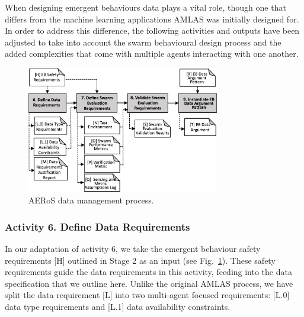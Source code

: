 \documentclass[runningheads]{llncs}
\begin{document}
When designing emergent behaviours data plays a vital role, though one that differs from the machine learning applications AMLAS was initially designed for. In order to address this difference, the following activities and outputs have been adjusted to take into account the swarm behavioural design process and the added complexities that come with multiple agents interacting with one another.

\vspace{-4ex}
\begin{figure}
	\centering
	\includegraphics[width=0.75\textwidth]{figures/AMLAS-STAGE-3-V4.png}
	\vspace{-2ex}
	\caption{AERoS data management process.}
	\label{amlas-a-stage3}
	\vspace{-4ex}
\end{figure}

\vspace{-4ex}
\subsubsection*{Activity 6. Define Data Requirements}


In our adaptation of activity 6, we take the emergent behaviour safety requirements [H] outlined in Stage 2 as an input (see Fig.~\ref{amlas-a-stage3}). These safety requirements guide the data requirements in this activity, feeding into the data specification that we outline here. Unlike the original AMLAS process, we have split the data requirement [L] into two multi-agent focused requirements: [L.0] data type requirements and [L.1] data availability constraints.
\end{document}

